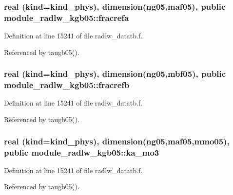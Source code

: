 \subsubsection[{\texorpdfstring{fracrefa}{fracrefa}}]{\setlength{\rightskip}{0pt plus 5cm}real (kind=kind\+\_\+phys), dimension(ng05,{\bf maf05}), public module\+\_\+radlw\+\_\+kgb05\+::fracrefa}\hypertarget{namespacemodule__radlw__kgb05_a335fd60e59154f47724d2e25fdf0a5fb}{}\label{namespacemodule__radlw__kgb05_a335fd60e59154f47724d2e25fdf0a5fb}


Definition at line 15241 of file radlw\+\_\+datatb.\+f.



Referenced by taugb05().

\subsubsection[{\texorpdfstring{fracrefb}{fracrefb}}]{\setlength{\rightskip}{0pt plus 5cm}real (kind=kind\+\_\+phys), dimension(ng05,{\bf mbf05}), public module\+\_\+radlw\+\_\+kgb05\+::fracrefb}\hypertarget{namespacemodule__radlw__kgb05_af7b1fd9c6b966e03a226dd8cbc058670}{}\label{namespacemodule__radlw__kgb05_af7b1fd9c6b966e03a226dd8cbc058670}


Definition at line 15241 of file radlw\+\_\+datatb.\+f.



Referenced by taugb05().

\subsubsection[{\texorpdfstring{ka\+\_\+mo3}{ka_mo3}}]{\setlength{\rightskip}{0pt plus 5cm}real (kind=kind\+\_\+phys), dimension(ng05,{\bf maf05},{\bf mmo05}), public module\+\_\+radlw\+\_\+kgb05\+::ka\+\_\+mo3}\hypertarget{namespacemodule__radlw__kgb05_a6021fc2f60379615b7882a28e1caa1e9}{}\label{namespacemodule__radlw__kgb05_a6021fc2f60379615b7882a28e1caa1e9}


Definition at line 15241 of file radlw\+\_\+datatb.\+f.



Referenced by taugb05().

